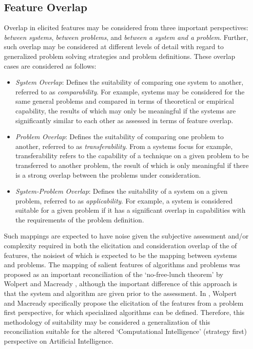 \documentclass[a4paper, 11pt]{article}
\begin{document}
\subsection{Feature Overlap}
Overlap in elicited features may be considered from three important perspectives: \emph{between systems}, \emph{between problems}, and \emph{between a system and a problem}. Further, such overlap may be considered at different levels of detail with regard to generalized problem solving strategies and problem definitions.
These overlap cases are considered as follows:

\begin{itemize}
	\item \emph{System Overlap}: Defines the suitability of comparing one system to another, referred to as \emph{comparability}. For example, systems may be considered for the same general problems and compared in terms of theoretical or empirical capability, the results of which may only be meaningful if the systems are significantly similar to each other as assessed in terms of feature overlap. 
	\item \emph{Problem Overlap}: Defines the suitability of comparing one problem to another, referred to as \emph{transferability}. From a systems focus for example, transferability refers to the capability of a technique on a given problem to be transferred to another problem, the result of which is only meaningful if there is a strong overlap between the problems under consideration.
	\item \emph{System-Problem Overlap}: Defines the suitability of a system on a given problem, referred to as \emph{applicability}. For example, a system is considered suitable for a given problem if it has a significant overlap in capabilities with the requirements of the problem definition.
\end{itemize}

Such mappings are expected to have noise given the subjective assessment and/or complexity required in both the elicitation and consideration overlap of the of features, the noisiest of which is expected to be the mapping between systems and problems. 
The mapping of salient features of algorithms and problems was proposed as an important reconciliation of the `no-free-lunch theorem' by Wolpert and Macready \cite{Wolpert1997}, although the important difference of this approach is that the system and algorithm are given prior to the assessment. In \cite{Wolpert1995}, Wolpert and Macready specifically propose the elicitation of the features from a problem first perspective, for which specialized algorithms can be defined. Therefore, this methodology of suitability may be considered a generalization of this reconciliation suitable for the altered `Computational Intelligence' (strategy first) perspective on Artificial Intelligence.
\end{document}
